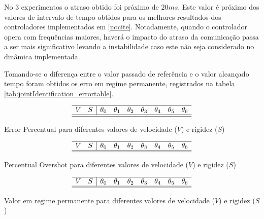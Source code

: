 No 3 experimentos o atraso obtido foi próximo de $20ms$. Este valor é próximo dos valores de intervalo de tempo obtidos para os melhores resultados dos controladores implementados em \ref{nocite}. Notadamente, quando o controlador opera com frequências maiores, haverá o impacto do atraso da comunicação passa a ser mais significativo levando a instabilidade caso este não seja considerado no dinâmica implementada.


Tomando-se o diferença entre o valor passado de referência e o valor alcançado tempo foram obtidos os erro em regime permanente, registrados na tabela \ref{tab:jointIdentification_errortable}.

\begin{table}[H]
    \centering
    $$\begin{array}{cc|ccccccc}
         \hline
         V & S & \theta_0 & \theta_1 & \theta_2 & \theta_3 & \theta_4 & \theta_5 & \theta_6\\
         \hline
         
         \hline
    \end{array}$$
    \caption{Error Percentual para diferentes valores de velocidade ($V$) e rigidez ($S$)}
    \label{tab:jointIdentification_errortable}
\end{table}

\begin{table}[H]
    \centering
    $$\begin{array}{cc|ccccccc}
         \hline
         V & S & \theta_0 & \theta_1 & \theta_2 & \theta_3 & \theta_4 & \theta_5 & \theta_6\\
         \hline
         
         \hline
    \end{array}$$
    \caption{Percentual Overshot para diferentes valores de velocidade ($V$) e rigidez ($S$)}
    \label{tab:jointIdentification_overshottable}
\end{table}

\begin{table}[H]
    \centering
    $$\begin{array}{cc|ccccccc}
         \hline
         V & S & \theta_0 & \theta_1 & \theta_2 & \theta_3 & \theta_4 & \theta_5 & \theta_6\\
         \hline
         
         \hline
    \end{array}$$
    \caption{Valor em regime permanente para diferentes valores de velocidade ($V$) e rigidez ($S$)}
    \label{tab:jointIdentification_steadstatetable}
\end{table}

